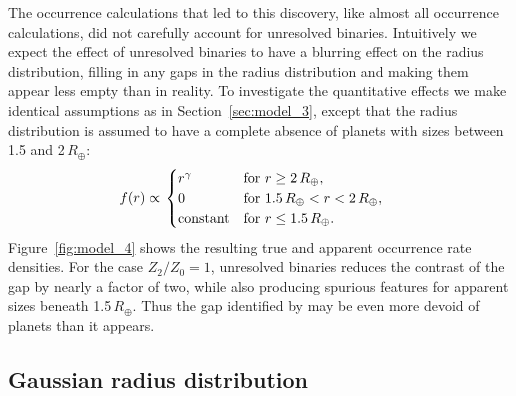 \documentclass[12pt,modern]{aastex61}
\begin{document}
The occurrence calculations that led to this discovery, like almost
all occurrence calculations, did not carefully account for
unresolved binaries.  Intuitively we expect the effect of unresolved
binaries to have a blurring effect on the radius distribution, filling
in any gaps in the radius distribution and making them appear less
empty than in reality.  To investigate the quantitative effects we
make identical assumptions as in Section~\ref{sec:model_3}, except
that the radius distribution is assumed to have a complete absence of
planets with sizes between 1.5 and 2\,$R_\oplus$:
\begin{align}
    f(r)
    &\propto
    \left.
    \begin{cases}
        r^\gamma & \text{for } r\geq 2\,R_\oplus, \\
        0 & \text{for } 1.5\,R_\oplus < r < 2\,R_\oplus, \\
        {\rm constant} & \text{for } r\leq 1.5\,R_\oplus.
    \end{cases}
    \right.
    \label{eq:model4_radius_distribution}
\end{align}
Figure~\ref{fig:model_4} shows the resulting true and apparent occurrence
rate densities.
For the case $Z_2/Z_0=1$, unresolved binaries reduces the contrast
of the gap by nearly a factor of two, while also producing
spurious features for apparent sizes beneath 1.5\,$R_\oplus$.
Thus the gap identified by \citet{fulton_california-_2017} may be
even more devoid of planets than it appears.


\subsection{Gaussian radius distribution}
\end{document}
